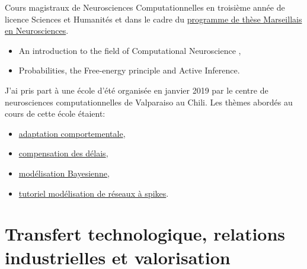 \documentclass[10pt,french,a4paper,oneside]{article}%
\newcommand{\years}[1]{\marginpar{\textit{\scriptsize #1}}}
\begin{document}
Cours magistraux de Neurosciences Computationnelles en  troisième année de licence Sciences et Humanités\years{2019} et dans le cadre du  \href{https://laurentperrinet.github.io/post/2018-03-26-cours-neuro-comp-fep/}{programme de thèse Marseillais en Neurosciences}\years{2018}.

\begin{itemize}
	\item An introduction to the field of Computational Neuroscience ,
	\item Probabilities, the Free-energy principle and Active Inference.
\end{itemize}


J'ai pris part à une école d'été organisée en janvier 2019 par le centre de neurosciences computationnelles de Valparaiso au Chili. Les thèmes abordés au cours de cette école étaient:
\begin{itemize}
	\item \href{https://laurentperrinet.github.io/talk/2019-01-18-laconeu/}{adaptation comportementale},
	\item \href{https://laurentperrinet.github.io/talk/2019-01-17-laconeu/}{compensation des délais},
	\item \href{https://laurentperrinet.github.io/talk/2019-01-16-laconeu/}{modélisation Bayesienne},
	\item \href{https://laurentperrinet.github.io/talk/2019-01-14-laconeu/}{tutoriel modélisation de réseaux à spikes}.

\end{itemize}


\section{Transfert technologique, relations industrielles et valorisation} %
\end{document}
